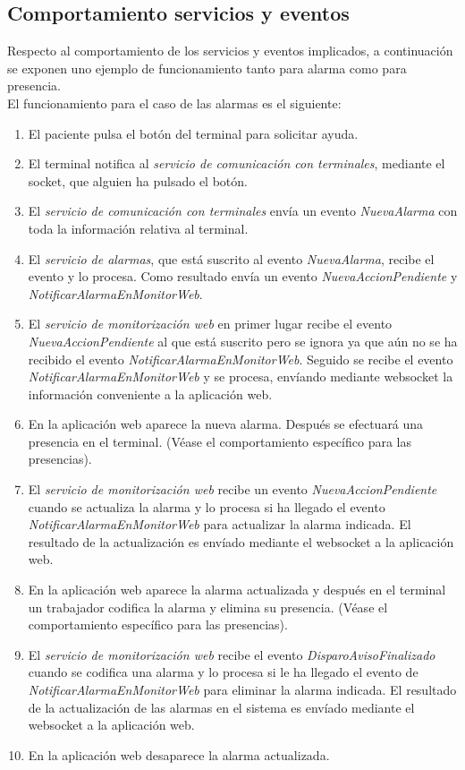 \subsection{Comportamiento servicios y eventos}
\label{subsection-comportamiento}
Respecto al comportamiento de los servicios y eventos implicados, a continuación se exponen uno ejemplo de funcionamiento tanto para alarma como para presencia.\\

El funcionamiento para el caso de las alarmas es el siguiente:
\begin{enumerate}
	\item El paciente pulsa el botón del terminal para solicitar ayuda.	
	\item El terminal notifica al \textit{servicio de comunicación con terminales}, mediante el socket, que alguien ha pulsado el botón.
	\item El \textit{servicio de comunicación con terminales} envía un evento \textit{NuevaAlarma} con toda la información relativa al terminal.
	\item El \textit{servicio de alarmas}, que está suscrito al evento \textit{NuevaAlarma}, recibe el evento y lo procesa. Como resultado envía un evento \textit{NuevaAccionPendiente} y \textit{NotificarAlarmaEnMonitorWeb}.
	\item El \textit{servicio de monitorización web} en primer lugar recibe el evento \textit{NuevaAccionPendiente} al que está suscrito pero se ignora ya que aún no se ha recibido el evento \textit{NotificarAlarmaEnMonitorWeb}. Seguido se recibe el evento \textit{NotificarAlarmaEnMonitorWeb} y se procesa, envíando mediante websocket la información conveniente a la aplicación web.
	\item En la aplicación web aparece la nueva alarma. Después se efectuará una presencia en el terminal. (Véase el comportamiento específico para las presencias).
	\item El \textit{servicio de monitorización web} recibe un evento \textit{NuevaAccionPendiente} cuando se actualiza la alarma y lo procesa si ha llegado el evento \textit{NotificarAlarmaEnMonitorWeb} para actualizar la alarma indicada. El resultado de la actualización es envíado mediante el websocket a la aplicación web.
	\item En la aplicación web aparece la alarma actualizada y después en el terminal un trabajador codifica la alarma y elimina su presencia. (Véase el comportamiento específico para las presencias).
	\item El \textit{servicio de monitorización web} recibe el evento \textit{DisparoAvisoFinalizado} cuando se codifica una alarma y lo procesa si le ha llegado el evento de \textit{NotificarAlarmaEnMonitorWeb} para eliminar la alarma indicada. El resultado de la actualización de las alarmas en el sistema es envíado mediante el websocket a la aplicación web.
	\item En la aplicación web desaparece la alarma actualizada.
\end{enumerate}

